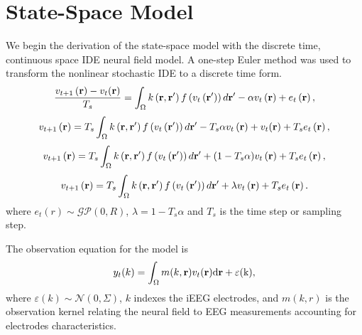 \documentclass[onecolumn,draftcls]{IEEEtran}
\begin{document}
\section{State-Space Model}
We begin the derivation of the state-space model with the discrete time, continuous space IDE neural field model. A one-step Euler method was used to transform the nonlinear stochastic IDE to a discrete time form.
\begin{equation}\label{SystemEq}
\frac{v_{t + 1}\left( \mathbf{r} \right) - v_t(\mathbf{r})}{T_s} = \int_\Omega  {k\left( \mathbf{r} , \mathbf{r'} \right)f\left( {v_t\left( \mathbf{r'} \right)} \right)d{\bf{r'}}}  - \alpha v_t\left( \mathbf{r} \right) + e_t\left( \mathbf{r} \right),
\end{equation}
\begin{equation}\label{SystemEq}
v_{t + 1}\left( \mathbf{r} \right)  = T_s\int_\Omega  {k\left( {{\bf{r}} , {\bf{r'}}} \right)f\left( {{v_t}\left( \bf{r'} \right)} \right)d{\bf{r'}}} - T_s\alpha {v_t}\left( {\bf{r}} \right) + v_t(\mathbf{r}) + T_se_t\left( {\mathbf{r}} \right),
\end{equation}
\begin{equation}\label{SystemEq}
v_{t + 1}\left( \mathbf{r} \right)  = T_s\int_\Omega  {k\left( {{\bf{r}} , {\bf{r'}}} \right)f\left( {{v_t}\left( \mathbf{r'} \right)} \right)d{\bf{r'}}} + (1 - T_s\alpha) v_t\left( {\bf{r}} \right) + T_se_t\left( {\mathbf{r}} \right),
\end{equation}
\begin{equation}\label{SystemEq}
v_{t + 1}\left( \mathbf{r} \right)  = T_s\int_\Omega  {k\left( {{\bf{r}} , {\bf{r'}}} \right)f\left( {{v_t}\left( \bf{r'} \right)} \right)d{\bf{r'}}} + \lambda v_t\left( {\bf{r}} \right) + T_se_t\left( {\mathbf{r}} \right).
\end{equation}
where $e_t(r)\sim \mathcal{GP}(0,R)$, $\lambda = 1-T_s\alpha$ and $T_s$ is the time step or sampling step.

The observation equation for the model is
\begin{equation}\label{ObservationEquation}
    y_t( k ) = \int_\Omega  m( k,\mathbf{r} )v_t( \mathbf{r}\rm ) d\mathbf{r}  + \varepsilon ( k ),
\end{equation}
where $\varepsilon( k )\sim\mathcal{N}(0,\Sigma)$, $k$ indexes the iEEG electrodes, and $m(k,r)$ is the observation kernel relating the neural field to EEG measurements accounting for electrodes characteristics.
\end{document}
